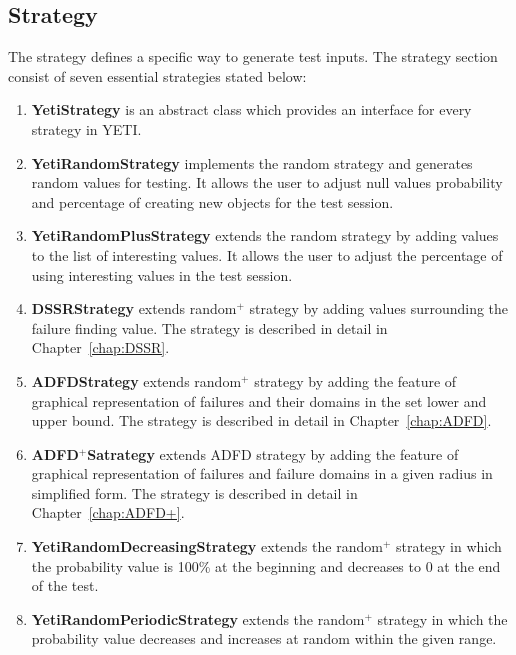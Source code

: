 \subsection{Strategy}
The strategy defines a specific way to generate test inputs. The strategy section consist of seven essential strategies stated below:
\begin{enumerate}
\item {\textbf{YetiStrategy}} is an abstract class which provides an interface for every strategy in YETI.
\item {\textbf{YetiRandomStrategy}} implements the random strategy and generates random values for testing. It allows the user to adjust null values probability and percentage of creating new objects for the test session. 
\item {\textbf{YetiRandomPlusStrategy}} extends the random strategy by adding values to the list of interesting values. It allows the user to adjust the percentage of using interesting values in the test session.
\item {\textbf{DSSRStrategy}} extends random$^+$ strategy by adding values surrounding the failure finding value. The strategy is described in detail in Chapter~\ref{chap:DSSR}.
\item {\textbf{ADFDStrategy}} extends random$^+$ strategy by adding the feature of graphical representation of failures and their domains in the set lower and upper bound. The strategy is described in detail in Chapter~\ref{chap:ADFD}.
\item {\textbf{ADFD$^+$Satrategy}} extends ADFD strategy by adding the feature of graphical representation of failures and failure domains in a given radius in simplified form. The strategy is described in detail in Chapter~\ref{chap:ADFD+}.
\item {\textbf{YetiRandomDecreasingStrategy}} extends the random$^+$ strategy in which the probability value is 100\% at the beginning and decreases to 0 at the end of the test.
\item {\textbf{YetiRandomPeriodicStrategy}} extends the random$^+$ strategy in which the probability value decreases and increases at random within the given range.
\end{enumerate}







